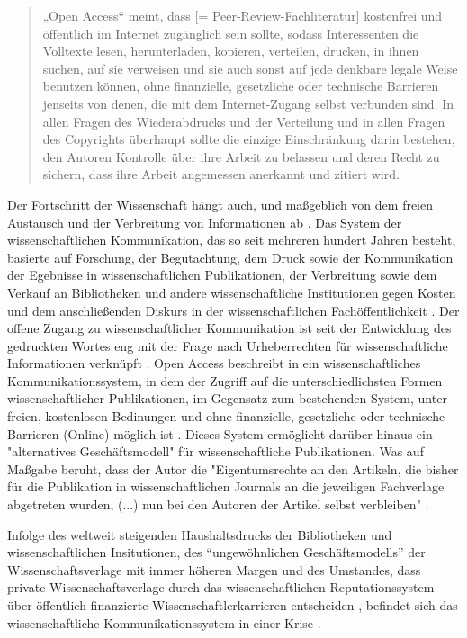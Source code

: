 \begin{quote}
„Open Access“ meint, dass [= Peer-Review-Fachliteratur] kostenfrei und öffentlich im Internet zugänglich sein sollte, sodass Interessenten die Volltexte lesen, herunterladen, kopieren, verteilen, drucken, in ihnen suchen, auf sie verweisen und sie auch sonst auf jede denkbare legale Weise benutzen können, ohne finanzielle, gesetzliche oder technische Barrieren jenseits von denen, die mit dem Internet-Zugang selbst verbunden sind. In allen Fragen des Wiederabdrucks und der Verteilung und in allen Fragen des Copyrights überhaupt sollte die einzige Einschränkung darin bestehen, den Autoren Kontrolle über ihre Arbeit zu belassen und deren Recht zu sichern, dass ihre Arbeit angemessen anerkannt und zitiert wird.
\cite{boai_2012}
\end{quote}
Der Fortschritt der Wissenschaft hängt auch, und maßgeblich von dem freien Austausch und der Verbreitung von Informationen ab \cite{cite:11}. Das System der wissenschaftlichen Kommunikation, das so seit mehreren hundert Jahren besteht, basierte auf Forschung, der Begutachtung, dem Druck sowie der Kommunikation der Egebnisse in wissenschaftlichen Publikationen, der Verbreitung sowie dem Verkauf an Bibliotheken und andere wissenschaftliche Institutionen gegen Kosten \cite{cite:11a} und dem anschließenden Diskurs in der wissenschaftlichen Fachöffentlichkeit \cite{suchen}. Der offene Zugang zu wissenschaftlicher Kommunikation ist seit der Entwicklung des gedruckten Wortes eng mit der Frage nach Urheberrechten für wissenschaftliche Informationen verknüpft \cite{Case_2000}. Open Access beschreibt in ein wissenschaftliches Kommunikationssystem, in dem der Zugriff auf die unterschiedlichsten Formen wissenschaftlicher Publikationen, im Gegensatz zum bestehenden System, unter freien, kostenlosen Bedinungen und ohne finanzielle, gesetzliche oder technische Barrieren (Online) möglich ist \cite{WD_bundestag_2009}. Dieses System ermöglicht darüber hinaus ein "alternatives Geschäftsmodell"\cite{lewis_2012_inevitability} für wissenschaftliche Publikationen. Was auf Maßgabe beruht, dass der Autor die "Eigentumsrechte an den Artikeln, die bisher für die Publikation in wissenschaftlichen Journals an die jeweiligen Fachverlage abgetreten wurden, (...) nun bei den Autoren der Artikel selbst verbleiben" \cite{Hess_2006}. 

Infolge des weltweit steigenden Haushaltsdrucks der Bibliotheken und wissenschaftlichen Insitutionen, des “ungewöhnlichen Geschäftsmodells” \cite{cite:12} der Wissenschaftsverlage mit immer höheren Margen \cite{albert_2006_open_implications} und des Umstandes, dass private Wissenschaftsverlage durch das wissenschaftlichen Reputationssystem über öffentlich finanzierte Wissenschaftlerkarrieren entscheiden \cite{heise_2012}, befindet sich das wissenschaftliche Kommunikationssystem in einer Krise \cite{cite:14}. 

